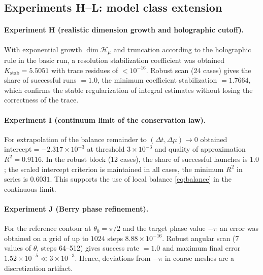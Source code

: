 \documentclass[11pt,a4paper]{article}
\theoremstyle{definition}
\theoremstyle{plain}
\theoremstyle{remark}
\begin{document}
\subsection{Experiments H--L: model class extension}
\label{sec:numerics:HIJKL}

\paragraph{Experiment H (realistic dimension growth and holographic cutoff).}
With exponential growth $\dim\mathcal H_\mu$ and truncation according to the holographic rule
in the basic run, a resolution stabilization coefficient was obtained
$K_{\mathrm{stab}}=5.5051$
with trace residues of $<10^{-16}$.
Robust scan (24 cases) gives
the share of successful runs $=1.0$,
the minimum coefficient stabilization $=1.7664$,
which confirms the stable regularization of integral estimates without losing the correctness of the trace.

\paragraph{Experiment I (continuum limit of the conservation law).}
For extrapolation of the balance remainder to $(\Delta t,\Delta\mu)\to 0$
obtained
$\mathrm{intercept}=-2.317\times10^{-3}$
at threshold $3\times10^{-3}$ and quality of approximation
$R^2=0.9116$.
In the robust block (12 cases), the share of successful launches is $1.0$;
the scaled intercept criterion is maintained in all cases,
the minimum $R^2$ in series is $0.6031$.
This supports the use of local balance \eqref{eq:balance} in the continuous limit.

\paragraph{Experiment J (Berry phase refinement).}
For the reference contour at $\theta_0=\pi/2$ and the target phase value $-\pi$
an error was obtained on a grid of up to $1024$ steps
$8.88\times10^{-16}$.
Robust angular scan (7 values of $\theta$, steps 64--512) gives
success rate $=1.0$ and
maximum final error
$1.52\times10^{-5}\ll 3\times10^{-3}$.
Hence, deviations from $-\pi$ in coarse meshes are a discretization artifact.
\end{document}
